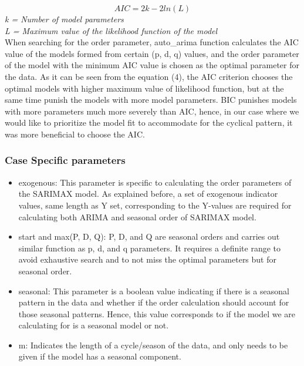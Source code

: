 \documentclass[]{usiinfbachelorproject}
\begin{document}
\begin{itemize}
\newpage
\begin{equation}
    AIC = 2k - 2ln(L) 
\end{equation}
\textit{k = Number of model parameters}\\
\textit{L = Maximum value of the likelihood function of the model}\\

When searching for the order parameter, auto\_arima function calculates the AIC value of the models formed from certain (p, d, q) values, and the order parameter of the model with the minimum AIC value is chosen as the optimal parameter for the data. As it can be seen from the equation (4), the AIC criterion chooses the optimal models with higher maximum value of likelihood function, but at the same time punish the models with more model parameters. BIC punishes models with more parameters much more severely than AIC, hence, in our case where we would like to prioritize the model fit to accommodate for the cyclical pattern, it was more beneficial to choose the AIC.\\
\end{itemize}

\subsubsection{Case Specific parameters}
\begin{itemize}
 \item exogenous: This parameter is specific to calculating the order parameters of the SARIMAX model. As explained before, a set of exogenous indicator values, same length as Y set, corresponding to the Y-values are required for calculating both ARIMA and seasonal order of SARIMAX model. \\
 
 \item start and max(P, D, Q): P, D, and Q are seasonal orders and carries out similar function as p, d, and q parameters. It requires a definite range to avoid exhaustive search and to not miss the optimal parameters but for seasonal order. \\
 
 \item seasonal: This parameter is a boolean value indicating if there is a seasonal pattern in the data and whether if the order calculation should account for those seasonal patterns. Hence, this value corresponds to if the model we are calculating for is a seasonal model or not.\\
 
 \item m: Indicates the length of a cycle/season of the data, and only needs to be given if the model has a seasonal component.\\
\end{itemize}
\end{document}
